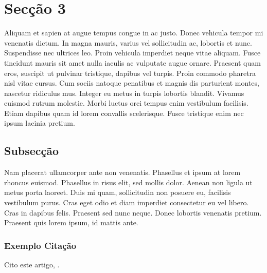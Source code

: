 \section{Secção 3}
\label{sec3}
Aliquam et sapien at augue tempus congue in ac justo. Donec vehicula tempor mi venenatis dictum. In magna mauris, varius vel sollicitudin ac, lobortis et nunc. Suspendisse nec ultrices leo. Proin vehicula imperdiet neque vitae aliquam. Fusce tincidunt mauris sit amet nulla iaculis ac vulputate augue ornare. Praesent quam eros, suscipit ut pulvinar tristique, dapibus vel turpis. Proin commodo pharetra nisl vitae cursus. Cum sociis natoque penatibus et magnis dis parturient montes, nascetur ridiculus mus. Integer eu metus in turpis lobortis blandit. Vivamus euismod rutrum molestie. Morbi luctus orci tempus enim vestibulum facilisis. Etiam dapibus quam id lorem convallis scelerisque. Fusce tristique enim nec ipsum lacinia pretium.

\subsection{Subsecção}

Nam placerat ullamcorper ante non venenatis. Phasellus et ipsum at lorem rhoncus euismod. Phasellus in risus elit, sed mollis dolor. Aenean non ligula ut metus porta laoreet. Duis mi quam, sollicitudin non posuere eu, facilisis vestibulum purus. Cras eget odio et diam imperdiet consectetur eu vel libero. Cras in dapibus felis. Praesent sed nunc neque. Donec lobortis venenatis pretium. Praesent quis lorem ipsum, id mattis ante. 

\subsubsection{Exemplo Citação}

Cito este artigo, \cite{modelo-jetson-cad}.